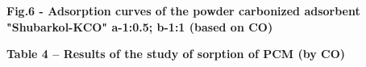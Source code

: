 
{\bfseries Fig.6 - Adsorption curves of the powder carbonized adsorbent
"Shubarkol-KCO" a-1:0.5; b-1:1 (based
on CO)}

{\bfseries Table 4 -- Results of the study of sorption of PCM (by
CO)}

